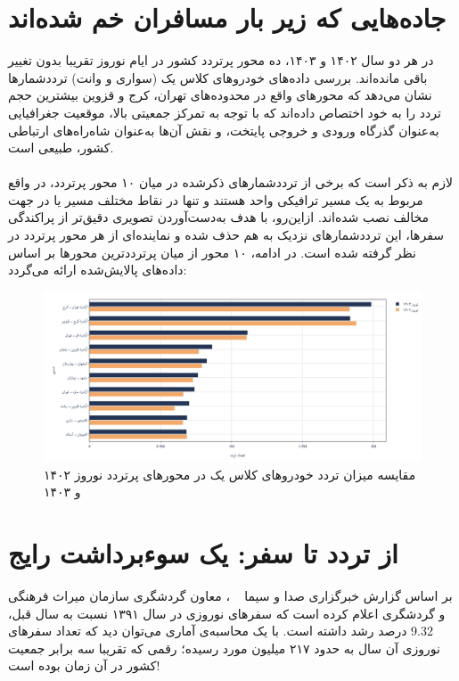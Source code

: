 \documentclass[a4paper, 12pt]{article}
\begin{document}
\section{جاده‌هایی که زیر بار مسافران خم شده‌اند}
در هر دو سال ۱۴۰۲ و ۱۴۰۳، ده محور پرتردد کشور در ایام نوروز تقریبا بدون تغییر باقی مانده‌اند. بررسی داده‌های خودروهای کلاس یک (سواری و وانت) ترددشمارها نشان می‌دهد که محورهای واقع در محدوده‌های تهران، کرج و قزوین بیشترین حجم تردد را به خود اختصاص داده‌اند که با توجه به تمرکز جمعیتی بالا، موقعیت جغرافیایی به‌عنوان گذرگاه ورودی و خروجی پایتخت، و نقش آن‌ها به‌عنوان شاه‌راه‌های ارتباطی کشور، طبیعی است.
\\
\\
لازم به ذکر است که برخی از ترددشمارهای ذکرشده در میان ۱۰ محور پرتردد، در واقع مربوط به یک مسیر ترافیکی واحد هستند و تنها در نقاط مختلف مسیر یا در جهت مخالف نصب شده‌اند. ازاین‌رو، با هدف به‌دست‌آوردن تصویری دقیق‌تر از پراکندگی سفرها، این ترددشمارهای نزدیک به هم حذف شده و نماینده‌ای از هر محور پرتردد در نظر گرفته شده است. در ادامه، ۱۰ محور از میان پرترددترین محورها بر اساس داده‌های پالایش‌شده ارائه می‌گردد:
\begin{figure}[htbp]
    \centering
    \includegraphics[width=1\textwidth]{most_taradod_roads.png}
    \caption{مقایسه میزان تردد خودروهای کلاس یک در محورهای پرتردد نوروز ۱۴۰۲ و ۱۴۰۳}
\end{figure}

\newpage
\section{از تردد تا سفر: یک سوء‌برداشت رایج}
بر اساس گزارش خبرگزاری صدا و سیما
~\cite{irib}
، معاون گردشگری سازمان میراث فرهنگی و گردشگری اعلام کرده است که سفرهای نوروزی در سال ۱۳۹۱ نسبت به سال قبل،
9.32
درصد رشد داشته است. با یک محاسبه‌ی آماری می‌توان دید که تعداد سفرهای نوروزی آن سال به حدود ۲۱۷ میلیون مورد رسیده؛ رقمی که تقریبا سه برابر جمعیت کشور در آن زمان بوده است!
~\cite{mashregh, khorasan}
\\
\end{document}
